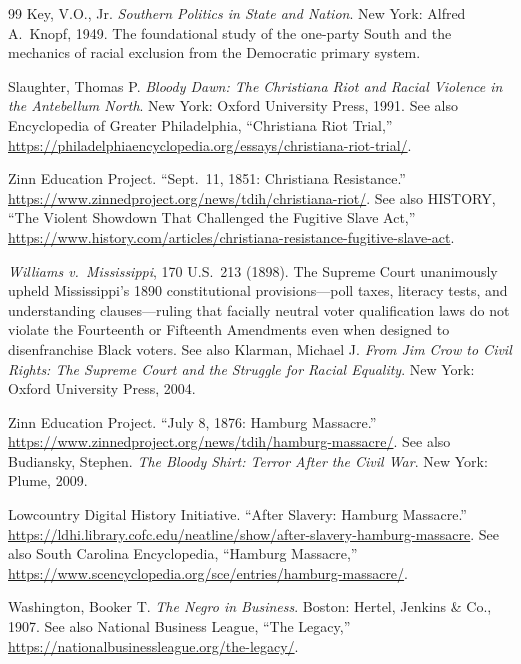 \documentclass[12pt,openany]{book}
\begin{document}
\begin{thebibliography}{99}
Key, V.O., Jr. \textit{Southern Politics in State and Nation}. New York: Alfred A.\ Knopf, 1949. The foundational study of the one-party South and the mechanics of racial exclusion from the Democratic primary system.


Slaughter, Thomas P. \textit{Bloody Dawn: The Christiana Riot and Racial Violence in the Antebellum North}. New York: Oxford University Press, 1991. See also Encyclopedia of Greater Philadelphia, ``Christiana Riot Trial,'' \url{https://philadelphiaencyclopedia.org/essays/christiana-riot-trial/}.

Zinn Education Project. ``Sept.\ 11, 1851: Christiana Resistance.'' \url{https://www.zinnedproject.org/news/tdih/christiana-riot/}. See also HISTORY, ``The Violent Showdown That Challenged the Fugitive Slave Act,'' \url{https://www.history.com/articles/christiana-resistance-fugitive-slave-act}.


\textit{Williams v.\ Mississippi}, 170 U.S.~213 (1898). The Supreme Court unanimously upheld Mississippi's 1890 constitutional provisions---poll taxes, literacy tests, and understanding clauses---ruling that facially neutral voter qualification laws do not violate the Fourteenth or Fifteenth Amendments even when designed to disenfranchise Black voters. See also Klarman, Michael J. \textit{From Jim Crow to Civil Rights: The Supreme Court and the Struggle for Racial Equality}. New York: Oxford University Press, 2004.


Zinn Education Project. ``July 8, 1876: Hamburg Massacre.'' \url{https://www.zinnedproject.org/news/tdih/hamburg-massacre/}. See also Budiansky, Stephen. \textit{The Bloody Shirt: Terror After the Civil War}. New York: Plume, 2009.

Lowcountry Digital History Initiative. ``After Slavery: Hamburg Massacre.'' \url{https://ldhi.library.cofc.edu/neatline/show/after-slavery-hamburg-massacre}. See also South Carolina Encyclopedia, ``Hamburg Massacre,'' \url{https://www.scencyclopedia.org/sce/entries/hamburg-massacre/}.


Washington, Booker T. \textit{The Negro in Business}. Boston: Hertel, Jenkins \& Co., 1907. See also National Business League, ``The Legacy,'' \url{https://nationalbusinessleague.org/the-legacy/}.


\end{thebibliography}
\end{document}
